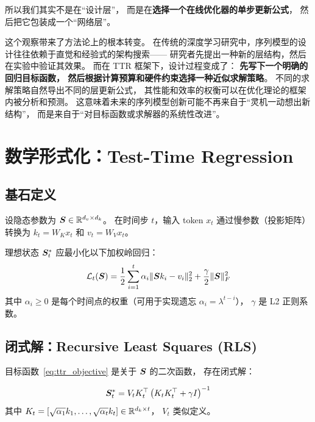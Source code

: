 所以我们其实不是在``设计层''，
而是在\textbf{选择一个在线优化器的单步更新公式}，
然后把它包装成一个``网络层''。

这个观察带来了方法论上的根本转变。
在传统的深度学习研究中，序列模型的设计往往依赖于直觉和经验式的架构搜索——
研究者先提出一种新的层结构，然后在实验中验证其效果。
而在 TTR 框架下，设计过程变成了：
\textbf{先写下一个明确的回归目标函数，
然后根据计算预算和硬件约束选择一种近似求解策略}。
不同的求解策略自然导出不同的层更新公式，
其性能和效率的权衡可以在优化理论的框架内被分析和预测。
这意味着未来的序列模型创新可能不再来自于``灵机一动想出新结构''，
而是来自于``对目标函数或求解器的系统性改进''。

\section{数学形式化：Test-Time Regression}
\label{sec:ttr_math}

\subsection{基石定义}

\begin{definition}
\label{def:ttr}
设隐态参数为 $\boldsymbol{S} \in \mathbb{R}^{d_v \times d_k}$。
在时间步 $t$，输入 token $x_t$
通过慢参数（投影矩阵）转换为 $k_t = W_K x_t$ 和 $v_t = W_V x_t$。

理想状态 $\boldsymbol{S}_t^*$ 应最小化以下加权岭回归：
\begin{equation}
  \mathcal{L}_t(\boldsymbol{S}) = \frac{1}{2}\sum_{i=1}^{t} \alpha_i \|\boldsymbol{S} k_i - v_i\|_2^2
  + \frac{\gamma}{2}\|\boldsymbol{S}\|_F^2
  \label{eq:ttr_objective}
\end{equation}
其中 $\alpha_i \ge 0$ 是每个时间点的权重（可用于实现遗忘 $\alpha_i = \lambda^{t-i}$），
$\gamma$ 是 L2 正则系数。
\end{definition}

\subsection{闭式解：Recursive Least Squares (RLS)}

目标函数~\eqref{eq:ttr_objective} 是关于 $\boldsymbol{S}$ 的二次函数，
存在闭式解：

\begin{equation}
  \boldsymbol{S}_t^* = V_t K_t^\top \left(K_t K_t^\top + \gamma I\right)^{-1}
  \label{eq:ttr_closedform}
\end{equation}
其中 $K_t = [\sqrt{\alpha_1} k_1, \ldots, \sqrt{\alpha_t} k_t] \in \mathbb{R}^{d_k \times t}$，
$V_t$ 类似定义。

